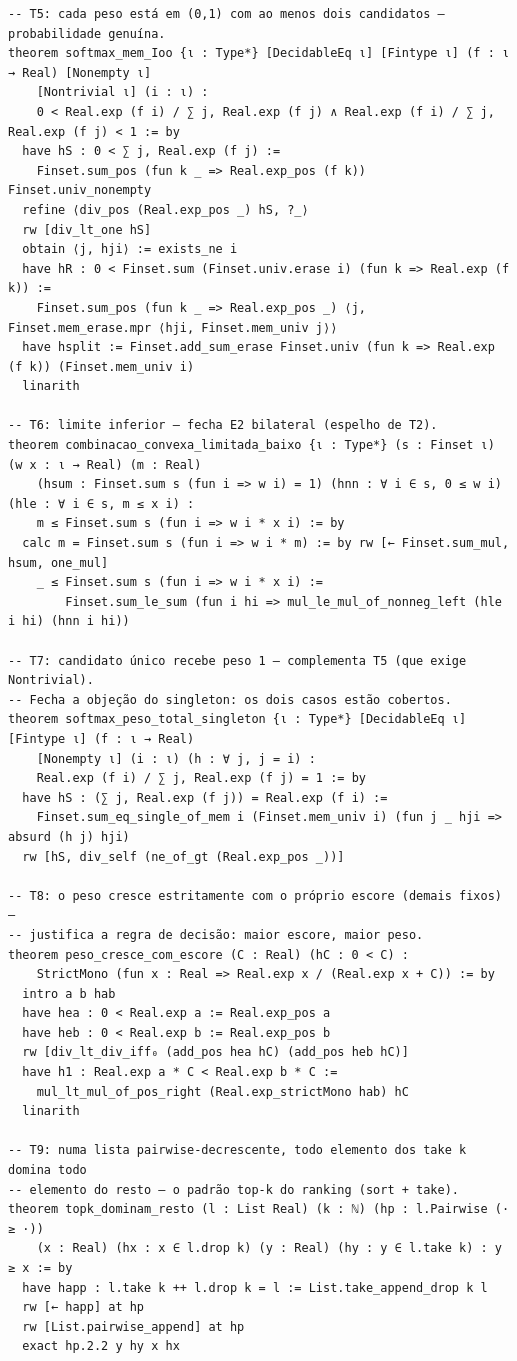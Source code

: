 \documentclass[12pt,openany,oneside,a4paper,brazil,chapter=TITLE]{abntex2}
\begin{document}
\begin{lstlisting}
-- T5: cada peso está em (0,1) com ao menos dois candidatos — probabilidade genuína.
theorem softmax_mem_Ioo {ι : Type*} [DecidableEq ι] [Fintype ι] (f : ι → Real) [Nonempty ι]
    [Nontrivial ι] (i : ι) :
    0 < Real.exp (f i) / ∑ j, Real.exp (f j) ∧ Real.exp (f i) / ∑ j, Real.exp (f j) < 1 := by
  have hS : 0 < ∑ j, Real.exp (f j) :=
    Finset.sum_pos (fun k _ => Real.exp_pos (f k)) Finset.univ_nonempty
  refine ⟨div_pos (Real.exp_pos _) hS, ?_⟩
  rw [div_lt_one hS]
  obtain ⟨j, hji⟩ := exists_ne i
  have hR : 0 < Finset.sum (Finset.univ.erase i) (fun k => Real.exp (f k)) :=
    Finset.sum_pos (fun k _ => Real.exp_pos _) ⟨j, Finset.mem_erase.mpr ⟨hji, Finset.mem_univ j⟩⟩
  have hsplit := Finset.add_sum_erase Finset.univ (fun k => Real.exp (f k)) (Finset.mem_univ i)
  linarith

-- T6: limite inferior — fecha E2 bilateral (espelho de T2).
theorem combinacao_convexa_limitada_baixo {ι : Type*} (s : Finset ι) (w x : ι → Real) (m : Real)
    (hsum : Finset.sum s (fun i => w i) = 1) (hnn : ∀ i ∈ s, 0 ≤ w i) (hle : ∀ i ∈ s, m ≤ x i) :
    m ≤ Finset.sum s (fun i => w i * x i) := by
  calc m = Finset.sum s (fun i => w i * m) := by rw [← Finset.sum_mul, hsum, one_mul]
    _ ≤ Finset.sum s (fun i => w i * x i) :=
        Finset.sum_le_sum (fun i hi => mul_le_mul_of_nonneg_left (hle i hi) (hnn i hi))

-- T7: candidato único recebe peso 1 — complementa T5 (que exige Nontrivial).
-- Fecha a objeção do singleton: os dois casos estão cobertos.
theorem softmax_peso_total_singleton {ι : Type*} [DecidableEq ι] [Fintype ι] (f : ι → Real)
    [Nonempty ι] (i : ι) (h : ∀ j, j = i) :
    Real.exp (f i) / ∑ j, Real.exp (f j) = 1 := by
  have hS : (∑ j, Real.exp (f j)) = Real.exp (f i) :=
    Finset.sum_eq_single_of_mem i (Finset.mem_univ i) (fun j _ hji => absurd (h j) hji)
  rw [hS, div_self (ne_of_gt (Real.exp_pos _))]

-- T8: o peso cresce estritamente com o próprio escore (demais fixos) —
-- justifica a regra de decisão: maior escore, maior peso.
theorem peso_cresce_com_escore (C : Real) (hC : 0 < C) :
    StrictMono (fun x : Real => Real.exp x / (Real.exp x + C)) := by
  intro a b hab
  have hea : 0 < Real.exp a := Real.exp_pos a
  have heb : 0 < Real.exp b := Real.exp_pos b
  rw [div_lt_div_iff₀ (add_pos hea hC) (add_pos heb hC)]
  have h1 : Real.exp a * C < Real.exp b * C :=
    mul_lt_mul_of_pos_right (Real.exp_strictMono hab) hC
  linarith

-- T9: numa lista pairwise-decrescente, todo elemento dos take k domina todo
-- elemento do resto — o padrão top-k do ranking (sort + take).
theorem topk_dominam_resto (l : List Real) (k : ℕ) (hp : l.Pairwise (· ≥ ·))
    (x : Real) (hx : x ∈ l.drop k) (y : Real) (hy : y ∈ l.take k) : y ≥ x := by
  have happ : l.take k ++ l.drop k = l := List.take_append_drop k l
  rw [← happ] at hp
  rw [List.pairwise_append] at hp
  exact hp.2.2 y hy x hx


\end{lstlisting}
\end{document}
